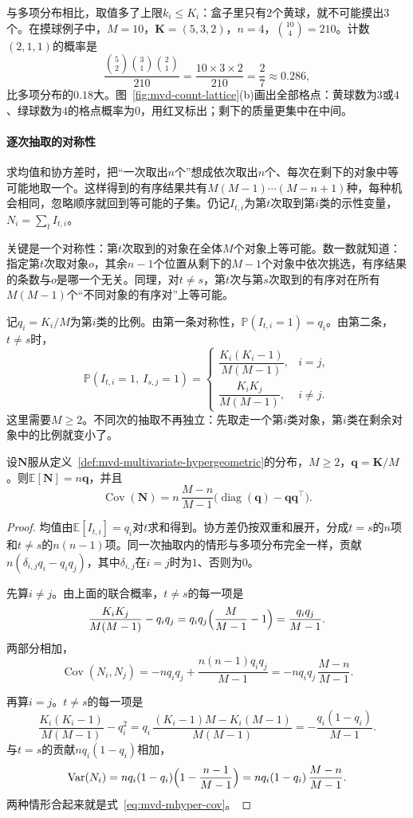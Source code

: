 与多项分布相比，取值多了上限$k_i\leq K_i$：盒子里只有$2$个黄球，就不可能摸出$3$个。在摸球例子中，$M=10$，$\bm{K}=(5,3,2)$，$n=4$，$\binom{10}{4}=210$。计数$(2,1,1)$的概率是
\[
 \frac{\binom{5}{2}\binom{3}{1}\binom{2}{1}}{210}=\frac{10\times3\times2}{210}=\frac{2}{7}\approx0.286 ,
\]
比多项分布的$0.18$大。图~\ref{fig:mvd-count-lattice}(b)画出全部格点：黄球数为$3$或$4$、绿球数为$4$的格点概率为$0$，用红叉标出；剩下的质量更集中在中间。

\paragraph{逐次抽取的对称性}
求均值和协方差时，把“一次取出$n$个”想成依次取出$n$个、每次在剩下的对象中等可能地取一个。这样得到的有序结果共有$M(M-1)\cdots(M-n+1)$种，每种机会相同，忽略顺序就回到等可能的子集。仍记$I_{t,i}$为第$t$次取到第$i$类的示性变量，$N_i=\sum_tI_{t,i}$。

关键是一个对称性：第$t$次取到的对象在全体$M$个对象上等可能。数一数就知道：指定第$t$次取对象$o$，其余$n-1$个位置从剩下的$M-1$个对象中依次挑选，有序结果的条数与$o$是哪一个无关。同理，对$t\neq s$，第$t$次与第$s$次取到的有序对在所有$M(M-1)$个“不同对象的有序对”上等可能。

记$q_i=K_i/M$为第$i$类的比例。由第一条对称性，$\mathbb{P}(I_{t,i}=1)=q_i$。由第二条，$t\neq s$时，
\[
 \mathbb{P}(I_{t,i}=1,\ I_{s,j}=1)=
 \begin{cases}
  \dfrac{K_i(K_i-1)}{M(M-1)}, & i=j,\\
  \dfrac{K_iK_j}{M(M-1)}, & i\neq j .
 \end{cases}
\]
这里需要$M\geq2$。不同次的抽取不再独立：先取走一个第$i$类对象，第$i$类在剩余对象中的比例就变小了。

\begin{theorem}[多元超几何计数的均值与协方差]
\label{thm:mvd-mhyper-moments}
设$\bm{N}$服从定义~\ref{def:mvd-multivariate-hypergeometric}的分布，$M\geq2$，$\bm{q}=\bm{K}/M$。则$\mathbb{E}[\bm{N}]=n\bm{q}$，并且
\begin{equation}
 \operatorname{Cov}(\bm{N})=n\,\frac{M-n}{M-1}\bigl(\operatorname{diag}(\bm{q})-\bm{q}\bm{q}^{\top}\bigr) .
 \label{eq:mvd-mhyper-cov}
\end{equation}
\end{theorem}

\begin{proof}
均值由$\mathbb{E}[I_{t,i}]=q_i$对$t$求和得到。协方差仍按双重和展开，分成$t=s$的$n$项和$t\neq s$的$n(n-1)$项。同一次抽取内的情形与多项分布完全一样，贡献$n(\delta_{i,j}q_i-q_iq_j)$，其中$\delta_{i,j}$在$i=j$时为$1$、否则为$0$。

先算$i\neq j$。由上面的联合概率，$t\neq s$的每一项是
\[
 \frac{K_iK_j}{M(M-1)}-q_iq_j=q_iq_j\Bigl(\frac{M}{M-1}-1\Bigr)=\frac{q_iq_j}{M-1} .
\]
两部分相加，
\[
 \operatorname{Cov}(N_i,N_j)=-nq_iq_j+\frac{n(n-1)q_iq_j}{M-1}=-nq_iq_j\,\frac{M-n}{M-1} .
\]

再算$i=j$。$t\neq s$的每一项是
\[
 \frac{K_i(K_i-1)}{M(M-1)}-q_i^{2}=q_i\,\frac{(K_i-1)M-K_i(M-1)}{M(M-1)}=-\frac{q_i(1-q_i)}{M-1} .
\]
与$t=s$的贡献$nq_i(1-q_i)$相加，
\[
 \operatorname{Var}(N_i)=nq_i(1-q_i)\Bigl(1-\frac{n-1}{M-1}\Bigr)=nq_i(1-q_i)\,\frac{M-n}{M-1} .
\]
两种情形合起来就是式~\eqref{eq:mvd-mhyper-cov}。
\end{proof}

